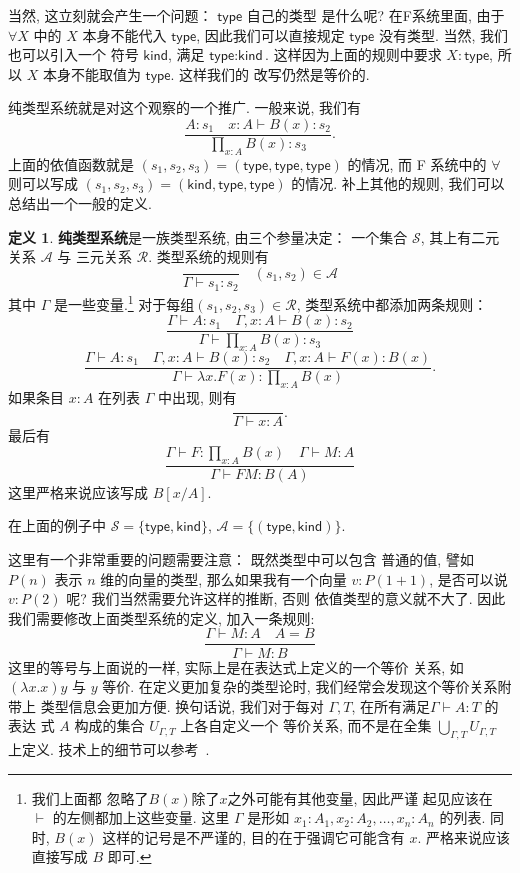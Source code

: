 \documentclass[UTF8]{ctexbook}
\newcommand{\cons}[1]{\textsf{#1}}
\theoremstyle{plain}
\theoremstyle{definition}
\newtheorem{definition}{定义}[chapter]
\theoremstyle{remark}
\begin{document}
当然, 这立刻就会产生一个问题： \(\cons{type}\) 自己的类型
是什么呢? 在F系统里面, 由于 \(\forall X\) 中的 \(X\)
本身不能代入 \(\cons{type}\), 因此我们可以直接规定
\(\cons{type}\) 没有类型. 当然, 我们也可以引入一个
符号 \(\cons{kind}\), 满足 \(\cons{type} : \cons{kind}\).
这样因为上面的规则中要求 \(X : \cons{type}\),
所以 \(X\) 本身不能取值为 \(\cons{type}\). 这样我们的
改写仍然是等价的.

纯类型系统就是对这个观察的一个推广. 一般来说, 我们有
\[\frac{A : s_1 \quad x{:}A \vdash B(x) : s_2}{\prod_{x:A}B(x) : s_3}.\]
上面的依值函数就是 \((s_1,s_2,s_3) = (\cons{type}, \cons{type}, \cons{type})\)
的情况, 而 F 系统中的 \(\forall\) 则可以写成
\((s_1,s_2,s_3) = (\cons{kind}, \cons{type}, \cons{type})\)
的情况. 补上其他的规则, 我们可以总结出一个一般的定义.
\begin{definition}
\textbf{纯类型系统}是一族类型系统, 由三个参量决定：
一个集合 \(\mathcal S\),
其上有二元关系 \(\mathcal A\) 与
三元关系 \(\mathcal R\). 类型系统的规则有
\[\frac{}{\Gamma\vdash s_1 : s_2} \quad (s_1, s_2) \in \mathcal A\]
其中 \(\Gamma\) 是一些变量.\footnote{我们上面都
忽略了\(B(x)\)除了\(x\)之外可能有其他变量, 因此严谨
起见应该在 \(\vdash\) 的左侧都加上这些变量. 这里 \(\Gamma\)
是形如 \(x_1{:}A_1, x_2{:}A_2, \dots, x_n{:}A_n\) 的列表.
同时, \(B(x)\) 这样的记号是不严谨的, 目的在于强调它可能含有 \(x\).
严格来说应该直接写成 \(B\) 即可.}
对于每组\((s_1,s_2,s_3)\in \mathcal R\),
类型系统中都添加两条规则：
\[\frac{\Gamma \vdash A : s_1 \quad \Gamma, x{:}A \vdash B(x) : s_2}{\Gamma \vdash \prod_{x:A} B(x) : s_3}\]
\[\frac{\Gamma \vdash A : s_1 \quad \Gamma, x{:}A \vdash B(x) : s_2\quad
\Gamma, x{:}A \vdash F(x) : B(x)}
{\Gamma \vdash \lambda x. F(x) : \prod_{x:A}B(x)}.\]
如果条目 \(x : A\) 在列表 \(\Gamma\) 中出现, 则有
\[\frac{}{\Gamma \vdash x : A}.\]
最后有
\[\frac{\Gamma \vdash F : \prod_{x:A}B(x) \quad
\Gamma \vdash M : A}{\Gamma \vdash FM : B(A)}\]
这里严格来说应该写成 \(B[x/A]\).
\end{definition}
在上面的例子中 \(\mathcal S = \{\cons{type}, \cons{kind}\}\),
\(\mathcal A = \{(\cons{type}, \cons{kind})\}\).

这里有一个非常重要的问题需要注意： 既然类型中可以包含
普通的值, 譬如 \(P(n)\) 表示 \(n\) 维的向量的类型,
那么如果我有一个向量 \(v : P(1+1)\), 是否可以说
\(v : P(2)\) 呢? 我们当然需要允许这样的推断, 否则
依值类型的意义就不大了. 因此我们需要修改上面类型系统的定义,
加入一条规则:
\[\frac{\Gamma \vdash M : A \quad A = B}{\Gamma \vdash M : B}\]
这里的等号与上面说的一样, 实际上是在表达式上定义的一个等价
关系, 如 \((\lambda x. x)y\) 与 \(y\) 等价.
在定义更加复杂的类型论时, 我们经常会发现这个等价关系附带上
类型信息会更加方便. 换句话说, 我们对于每对 \(\Gamma, T\),
在所有满足\(\Gamma \vdash A : T\) 的表达
式 \(A\) 构成的集合 \(U_{\Gamma, T}\) 上各自定义一个
等价关系, 而不是在全集 \(\bigcup_{\Gamma, T} U_{\Gamma, T}\) 上定义.
技术上的细节可以参考~\cite{barendregt:1992:lambda}.
\end{document}
